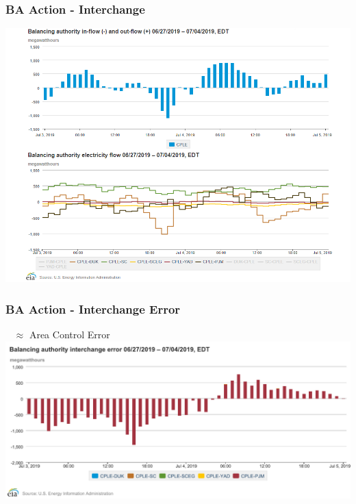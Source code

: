 \documentclass[14pt, unknownkeysallowed]{beamer}
\begin{document}
\begin{frame}
\frametitle{BA Action - Interchange} %
\begin{center}
\includegraphics[height=.85\textheight]{BAinterchange} %
\end{center}

\end{frame}
\begin{frame}
\frametitle{BA Action - Interchange Error} \ \vspace{.5em}
$\approx$ Area Control Error
{\centering
{\includegraphics[height=.6\textheight]{chart4}} %
}

\end{frame}
\end{document}
